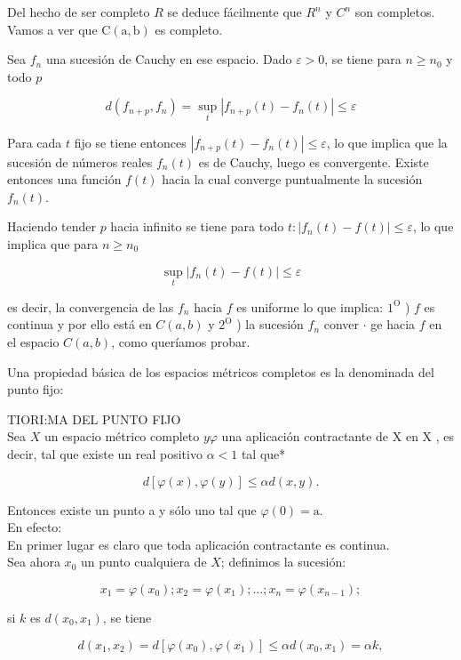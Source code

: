 \documentclass[10pt]{article}
\theoremstyle{plain}
\theoremstyle{definition}
\theoremstyle{remark}
\begin{document}
Del hecho de ser completo $R$ se deduce fácilmente que $R^{n}$ y $C^{n}$ son completos. Vamos a ver que $\mathrm{C}(\mathrm{a}, \mathrm{b})$ es completo.

Sea $f_{n}$ una sucesión de Cauchy en ese espacio. Dado $\varepsilon>0$, se tiene para $n \geqslant n_{0}$ y todo $p$

$$
d\left(f_{n+p}, f_{n}\right)=\sup _{t}\left|f_{n+p}(t)-f_{n}(t)\right| \leqslant \varepsilon
$$

Para cada $t$ fijo se tiene entonces $\left|f_{n+p}(t)-f_{n}(t)\right| \leqslant \varepsilon$, lo que implica que la sucesión de números reales $f_{n}(t)$ es de Cauchy, luego es convergente. Existe entonces una función $f(t)$ hacia la cual converge puntualmente la sucesión $f_{n}(t)$.

Haciendo tender $p$ hacia infinito se tiene para todo $t:\left|f_{n}(t)-f(t)\right| \leqslant \varepsilon$, lo que implica que para $n \geqslant n_{0}$

$$
\sup _{t}\left|f_{n}(t)-f(t)\right| \leqslant \varepsilon
$$

es decir, la convergencia de las $f_{n}$ hacia $f$ es uniforme lo que implica: $1^{\mathrm{O}}$ ) $f$ es continua y por ello está en $C(a, b)$ y $2^{\mathrm{O}}$ ) la sucesión $f_{n}$ conver $\cdot$ ge hacia $f$ en el espacio $C(a, b)$, como queríamos probar.

Una propiedad básica de los espacios métricos completos es la denominada del punto fijo:

TIORI:MA DEL PUNTO FIJO\\
Sea $X$ un espacio métrico completo $y \varphi$ una aplicación contractante de X en X , es decir, tal que existe un real positivo $\alpha<1$ tal que*

$$
d[\varphi(x), \varphi(y)] \leqslant \alpha d(x, y) .
$$

Entonces existe un punto a y sólo uno tal que $\varphi(0)=\mathrm{a}$.\\
En efecto:\\
En primer lugar es claro que toda aplicación contractante es continua.\\
Sea ahora $x_{0}$ un punto cualquiera de $X$; definimos la sucesión:

$$
x_{1}=\varphi\left(x_{0}\right) ; x_{2}=\varphi\left(x_{1}\right) ; \ldots ; x_{n}=\varphi\left(x_{n-1}\right) ;
$$

si $k$ es $d\left(x_{0}, x_{1}\right)$, se tiene

$$
d\left(x_{1}, x_{2}\right)=d\left[\varphi\left(x_{0}\right), \varphi\left(x_{1}\right)\right] \leqslant \alpha d\left(x_{0}, x_{1}\right)=\alpha k,
$$
\end{document}
